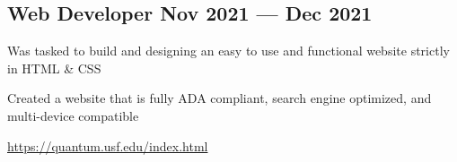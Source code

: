 \subsection{{Web Developer \hfill Nov 2021 --- Dec 2021}}
\begin{zitemize}
\begin{zitemize}
\item Was tasked to build and designing an easy to use and functional website strictly in HTML \& CSS
\item Created a website that is fully ADA compliant, search engine optimized, and multi-device compatible
\item \href{https://quantum.usf.edu/index.html}{https://quantum.usf.edu/index.html}
\end{zitemize}
\end{zitemize}



